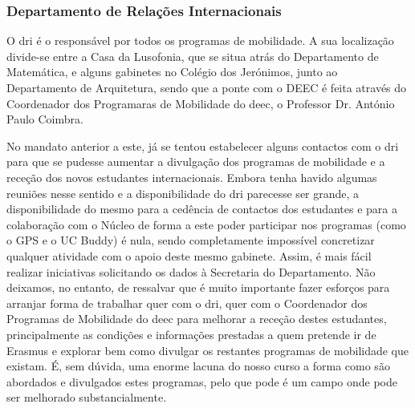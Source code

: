 
\subsubsection{Departamento de Relações Internacionais}
\label{mobilidade_relacionamentos}

O \acrfull{dri} é o responsável por todos os programas de mobilidade. A sua localização divide-se entre a Casa da Lusofonia, que se situa atrás do Departamento de Matemática, e alguns gabinetes no Colégio dos Jerónimos, junto ao Departamento de Arquitetura, sendo que a ponte com o DEEC é feita através do Coordenador dos Programaras de Mobilidade do \acrshort{deec}, o Professor Dr. António Paulo Coimbra.

No mandato anterior a este, já se tentou estabelecer alguns contactos com o \acrshort{dri} para que se pudesse aumentar a divulgação dos programas de mobilidade e a receção dos novos estudantes internacionais. Embora tenha havido algumas reuniões nesse sentido e a disponibilidade do \acrshort{dri} parecesse ser grande, a disponibilidade do mesmo para a cedência de contactos dos estudantes e para a colaboração com o Núcleo de forma a este poder participar nos programas (como o GPS e o UC Buddy) é nula, sendo completamente impossível concretizar qualquer atividade com o apoio deste mesmo gabinete. Assim, é mais fácil realizar iniciativas solicitando os dados à Secretaria do Departamento. Não deixamos, no entanto, de ressalvar que é muito importante fazer esforços para arranjar forma de trabalhar quer com o \acrfull{dri}, quer com o Coordenador dos Programas de Mobilidade do \acrshort{deec} para melhorar a receção destes estudantes, principalmente as condições e informações prestadas a quem pretende ir de Erasmus e explorar bem como divulgar os restantes programas de mobilidade que existam. É, sem dúvida, uma enorme lacuna do nosso curso a forma como são abordados e divulgados estes programas, pelo que pode é um campo onde pode ser melhorado substancialmente.